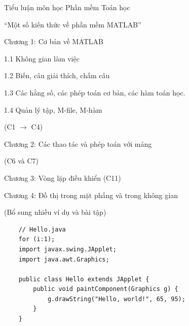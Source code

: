 \documentclass[12pt,a4paper]{article}
\begin{document}
	
	
	Tiểu luận môn học Phần mềm Toán học

“Một số kiến thức về phần mềm MATLAB”

Chương 1: Cơ bản về MATLAB

1.1  Không gian làm việc

1.2  Biến, câu giải thích, chấm câu

1.3  Các hằng số, các phép toán cơ bản, các hàm toán học.

1.4  Quản lý tập, M-file, M-hàm

(C1 $\rightarrow$ C4)

Chương 2: Các thao tác và phép toán với mảng

(C6 và C7)

Chương 3: Vòng lặp điều khiển (C11)

Chương 4: Đồ thị trong mặt phẳng và trong không gian

(Bổ sung nhiều ví dụ và bài tập)
	\begin{lstlisting}
	// Hello.java
	for (i:1);
	import javax.swing.JApplet;
	import java.awt.Graphics;

	public class Hello extends JApplet {
    	public void paintComponent(Graphics g) {
        	g.drawString("Hello, world!", 65, 95);
    	}    
	}
	\end{lstlisting}
	
\end{document}
